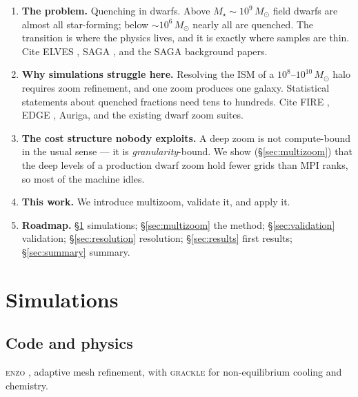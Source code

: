 \documentclass[twocolumn,linenumbers]{aastex631}
\newcommand{\Msun}{\ensuremath{M_\odot}}
\newcommand{\Mstar}{\ensuremath{M_\star}}
\newcommand{\enzo}{\textsc{enzo}}
\newcommand{\grackle}{\textsc{grackle}}
\begin{document}
\begin{enumerate}
\item \textbf{The problem.} Quenching in dwarfs. Above
$\Mstar \sim 10^{9}\,\Msun$ field dwarfs are almost all star-forming; below
$\sim 10^{6}\,\Msun$ nearly all are quenched. The transition is where the
physics lives, and it is exactly where samples are thin. Cite ELVES
\citep[][and the Kado-Fong SAGA background analysis]{Carlsten2022},
SAGA \citep{Geha2017,Mao2021}, and the SAGA background papers.

\item \textbf{Why simulations struggle here.} Resolving the ISM of a
$10^{8}$--$10^{10}\,\Msun$ halo requires zoom refinement, and one zoom
produces one galaxy. Statistical statements about quenched fractions need
tens to hundreds. Cite FIRE \citep{Hopkins2018,Wetzel2016}, EDGE
\citep{Agertz2020}, Auriga, and the existing dwarf zoom suites.

\item \textbf{The cost structure nobody exploits.} A deep zoom is not
compute-bound in the usual sense --- it is \emph{granularity}-bound. We show
(\S\ref{sec:multizoom}) that the deep levels of a production dwarf zoom hold
fewer grids than MPI ranks, so most of the machine idles.

\item \textbf{This work.} We introduce multizoom, validate it, and apply it.

\item \textbf{Roadmap.} \S\ref{sec:sims} simulations; \S\ref{sec:multizoom}
the method; \S\ref{sec:validation} validation; \S\ref{sec:resolution}
resolution; \S\ref{sec:results} first results; \S\ref{sec:summary} summary.
\end{enumerate}

\section{Simulations}
\label{sec:sims}

\subsection{Code and physics}
\label{sec:code}

\enzo{} \citep{Bryan2014}, adaptive mesh refinement, with \grackle{}
\citep{Smith2017} for non-equilibrium cooling and chemistry.
\end{document}
